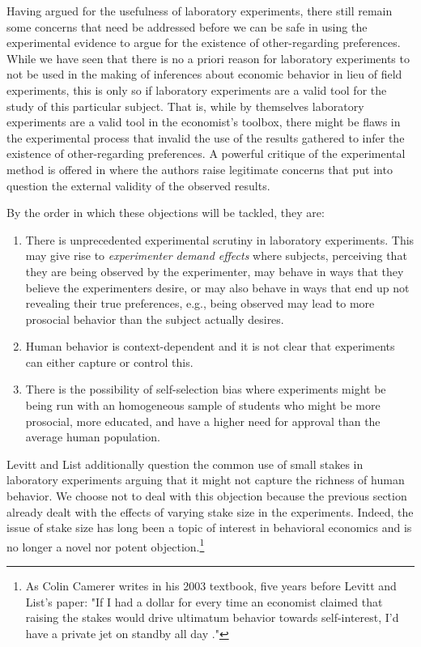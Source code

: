 \documentclass[12pt]{article}
\begin{document}
Having argued for the usefulness of laboratory experiments, there still remain some concerns that need be addressed before we can be safe in using the experimental evidence to argue for the existence of other-regarding preferences. While we have seen that there is no a priori reason for laboratory experiments to not be used in the making of inferences about economic behavior in lieu of field experiments, this is only so if laboratory experiments are a valid tool for the study of this particular subject. That is, while by themselves laboratory experiments are a valid tool in the economist's toolbox, there might be flaws in the experimental process that invalid the use of the results gathered to infer the existence of other-regarding preferences. A powerful critique of the experimental method is offered in \cite{levitt2007laboratory} where the authors raise legitimate concerns that put into question the external validity of the observed results.

By the order in which these objections will be tackled, they are:

\begin{enumerate}
	\item There is unprecedented experimental scrutiny in laboratory experiments. This may give rise to \textit{experimenter demand effects} where subjects, perceiving that they are being observed by the experimenter, may behave in ways that they believe the experimenters desire, or may also behave in ways that end up not revealing their true preferences, e.g., being observed may lead to more prosocial behavior than the subject actually desires. 
	\item Human behavior is context-dependent and it is not clear that experiments can either capture or control this.
	\item There is the possibility of self-selection bias where experiments might be being run with an homogeneous sample of students who might be more prosocial, more educated, and have a higher need for approval than the average human population.
\end{enumerate}

Levitt and List additionally question the common use of small stakes in laboratory experiments arguing that it might not capture the richness of human behavior. We choose not to deal with this objection because the previous section already dealt with the effects of varying stake size in the experiments. Indeed, the issue of stake size has long been a topic of interest in behavioral economics \citep{camerer1999effects} and is no longer a novel nor potent objection.\footnote{As Colin Camerer writes in his 2003 textbook, five years before Levitt and List's paper: "If I had a dollar for every time an economist claimed that raising the stakes would drive ultimatum behavior towards self-interest, I'd have a private jet on standby all day \citep[p.~60]{camerer2011behavioral}."}
\\
\end{document}
